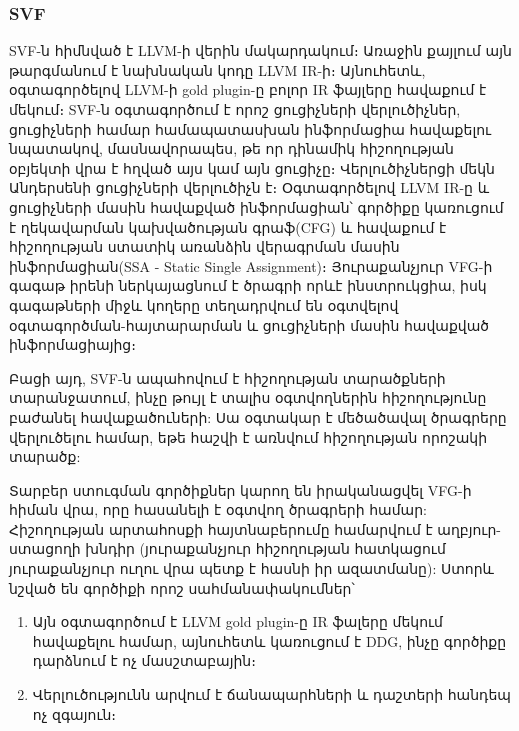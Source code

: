 \subsubsection{SVF}
SVF\cite{Sui2016}-ն հիմնված է LLVM-ի վերին մակարդակում։ Առաջին քայլում այն թարգմանում է նախնական կոդը LLVM IR-ի։
Այնուհետև, օգտագործելով LLVM-ի gold plugin-ը բոլոր IR ֆայլերը հավաքում է մեկում։ SVF-ն օգտագործում է որոշ ցուցիչների
վերլուծիչներ, ցուցիչների համար համապատասխան ինֆորմացիա հավաքելու նպատակով, մասնավորապես, թե որ դինամիկ հիշողության
օբյեկտի վրա է հղված այս կամ այն ցուցիչը։ Վերլուծիչներցի մեկն Անդերսենի ցուցիչների վերլուծիչն է\cite{Andersen}։
Օգտագործելով LLVM IR-ը և ցուցիչների մասին հավաքված ինֆորմացիան՝ գործիքը կառուցում է ղեկավարման կախվածության գրաֆ(CFG)
և հավաքում է հիշողության ստատիկ առանձին վերագրման մասին ինֆորմացիան(SSA - Static Single Assignment)։
Յուրաքանչյուր VFG-ի գագաթ իրենի ներկայացնում է ծրագրի որևէ ինստրուկցիա, իսկ գագաթների միջև կողերը տեղադրվում են
օգտվելով օգտագործման-հայտարարման և ցուցիչների մասին հավաքված ինֆորմացիայից։

Բացի այդ, SVF-ն ապահովում է հիշողության տարածքների տարանջատում, ինչը թույլ է տալիս օգտվողներին հիշողությունը բաժանել
հավաքածուների: Սա օգտակար է մեծածավալ ծրագրերը վերլուծելու համար, եթե հաշվի է առնվում հիշողության որոշակի տարածք:

Տարբեր ստուգման գործիքներ կարող են իրականացվել VFG-ի հիման վրա, որը հասանելի է օգտվող ծրագրերի համար:
Հիշողության արտահոսքի հայտնաբերումը համարվում է աղբյուր-ստացողի խնդիր (յուրաքանչյուր հիշողության հատկացում
յուրաքանչյուր ուղու վրա պետք է հասնի իր ազատմանը): Ստորև նշված են գործիքի որոշ սահմանափակումներ՝
\begin{enumerate}[itemsep=1mm]
    \item Այն օգտագործում է LLVM gold plugin-ը IR ֆալերը մեկում հավաքելու համար, այնուհետև կառուցում է DDG,
    ինչը գործիքը դարձնում է ոչ մասշտաբային։
    \item Վերլուծությունն արվում է ճանապարհների և դաշտերի հանդեպ ոչ զգայուն։
\end{enumerate}